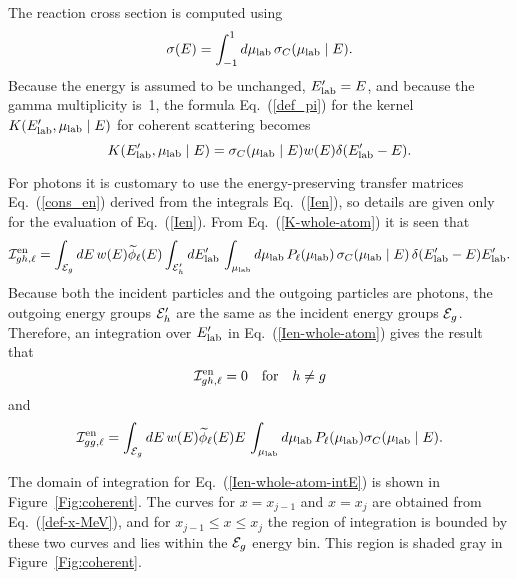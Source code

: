 The reaction cross section is computed using
\begin{equation}
  \sigma( E) = \int_{-1}^1 d\mu_{\text{lab}} \, \sigma_C(\mu_{\text{lab}} \mid E).
  \label{total-sigma-whole-atom}
\end{equation}
Because the energy is assumed to be unchanged, $E_{\text{lab}}' = E$, and
because the gamma multiplicity is~1,
the formula Eq.~(\ref{def_pi}) for the kernel 
$K(E_{\text{lab}}', \mu_{\text{lab}} \mid E)$ for coherent scattering becomes
\begin{equation}
   K(E_{\text{lab}}', \mu_{\text{lab}} \mid E) = \sigma_C(\mu_{\text{lab}} \mid E) w(E) \delta( E_{\text{lab}}' - E).
  \label{K-whole-atom}
\end{equation}

For photons it is customary to use the energy-preserving transfer
matrices Eq.~(\ref{cons_en}) derived from the integrals Eq.~(\ref{Ien}),
so details are given only for the evaluation of Eq.~(\ref{Ien}).
From Eq.~(\ref{K-whole-atom}) it is seen that
\begin{equation}
    {\cal I}^{\text{en}}_{gh,\ell} =
     \int_{{\cal E}_g} dE \, w(E) \widetilde \phi_\ell(E)
     \int_{{\cal E}_h' } dE_{\text{lab}}' \, \int_{\mu_{\text{lab}}} d\mu_{\text{lab}}  \, 
     P_\ell ( \mu_{\text{lab}} )\, \sigma_C(\mu_{\text{lab}} \mid E)
      \, \delta( E_{\text{lab}}' - E) E_{\text{lab}}'.
  \label{Ien-whole-atom}
\end{equation}
Because both the incident particles and the outgoing particles are
photons, the outgoing energy groups ${\cal E}_h'$ are the same as the
incident energy groups ${\cal E}_g$.  Therefore, an integration over
$E_{\text{lab}}'$ in Eq.~(\ref{Ien-whole-atom}) gives the result that
$$
  {\cal I}^{\text{en}}_{gh,\ell} = 0 \quad \textrm{for} \quad h \ne g
$$
and
\begin{equation}
   {\cal I}^{\text{en}}_{gg,\ell} =
   \int_{{\cal E}_g} dE \, w(E)  \widetilde \phi_\ell(E) E \,
   \int_{\mu_{\text{lab}}} d\mu_{\text{lab}}  \, P_\ell ( \mu_{\text{lab}} ) \sigma_C(\mu_{\text{lab}} \mid E).
  \label{Ien-whole-atom-intE}
\end{equation}

\begin{figure}

\end{figure}

The domain of integration for Eq.~(\ref{Ien-whole-atom-intE}) is
shown in Figure~\ref{Fig:coherent}.  The curves for $x = x_{j-1}$ and $x = x_j$
are obtained from Eq.~(\ref{def-x-MeV}), and for $x_{j-1} \le x \le x_j$
the region of integration is bounded by these two curves and
lies within the ${\cal E}_g$ energy bin.  This region is shaded gray in
Figure~\ref{Fig:coherent}.

